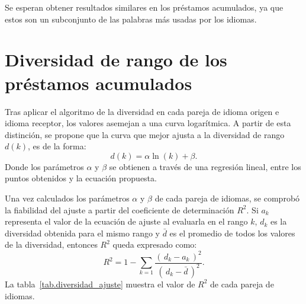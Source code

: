 Se esperan obtener resultados similares en los préstamos acumulados, ya que estos son un subconjunto de las palabras más usadas por los idiomas. 

\section{Diversidad de rango de los préstamos acumulados}

Tras aplicar el algoritmo de la diversidad en cada pareja de idioma origen e idioma receptor, los valores asemejan a una curva logarítmica.  A partir de esta distinción, se propone que la curva que mejor ajusta a la diversidad de rango $d(k)$, es de la forma:
\begin{equation}
\label{ec.ajuste} 
d(k) =  \alpha \ln(k) + \beta. 
\end{equation}
Donde los parámetros $\alpha$ y $\beta$  se  obtienen a través de una regresión lineal, entre los puntos obtenidos y la ecuación propuesta. 

Una vez calculados los parámetros $\alpha$ y $\beta$ de cada pareja de idiomas, se comprobó la fiabilidad del ajuste a partir del coeficiente de determinación $R^{2}$. Si $a_{k}$  representa el valor de la ecuación de ajuste al evaluarla en el rango $k$,  $d_{k}$ es la diversidad obtenida para el mismo rango y $\bar{d}$ es el promedio de todos los valores de la diversidad, entonces $R^{2}$ queda expresado como:
\begin{equation}
R^{2} = 1 - \sum_{k = 1} \frac{ \left( \,d_{k} - a_{k} \,\right)^{2}  }{ \left( \, d_{k} - \bar{d} \,\right)^{2} }.	
\label{ec.r2_diversidad}
\end{equation}
La tabla~\ref{tab.diversidad_ajuste} muestra el valor de $R^{2}$ de cada pareja de idiomas. 

  

